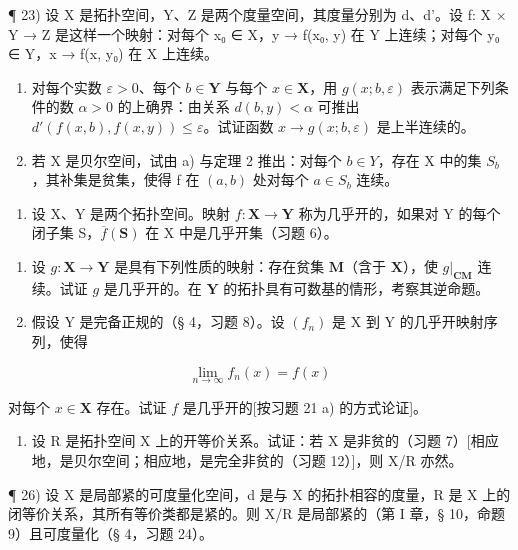 ¶ 23) 设 X 是拓扑空间，Y、Z 是两个度量空间，其度量分别为 d、d'。设 f: X × Y → Z 是这样一个映射：对每个 x₀ ∈ X，y → f(x₀, y) 在 Y 上连续；对每个 y₀ ∈ Y，x → f(x, y₀) 在 X 上连续。

\begin{enumerate}
\def\labelenumi{\alph{enumi})}
\item
  对每个实数 \(\varepsilon > 0\)、每个 \(b \in \mathbf{Y}\) 与每个 \(x \in \mathbf{X}\)，用 \(g(x; b, \varepsilon)\) 表示满足下列条件的数 \(\alpha > 0\) 的上确界：由关系 \(d(b, y) < \alpha\) 可推出 \(d'(f(x, b), f(x, y)) \leqslant \varepsilon\)。试证函数 \(x \to g(x; b, \varepsilon)\) 是上半连续的。
\item
  若 X 是贝尔空间，试由 a) 与定理 2 推出：对每个 \(b \in Y\)，存在 X 中的集 \(S_{b}\)，其补集是贫集，使得 f 在 \((a, b)\) 处对每个 \(a \in S_{b}\) 连续。
\end{enumerate}

\begin{enumerate}
\def\labelenumi{\arabic{enumi})}
\setcounter{enumi}{23}
\tightlist
\item
  设 X、Y 是两个拓扑空间。映射 \(f: \mathbf{X} \to \mathbf{Y}\) 称为几乎开的，如果对 Y 的每个闭子集 S，\(\overline{f}(\mathbf{S})\) 在 X 中是几乎开集（习题 6）。
\end{enumerate}

\begin{enumerate}
\def\labelenumi{\alph{enumi})}
\item
  设 \(g: \mathbf{X} \to \mathbf{Y}\) 是具有下列性质的映射：存在贫集 \(\mathbf{M}\)（含于 \(\mathbf{X}\)），使 \(g|_{\mathbf{CM}}\) 连续。试证 \(g\) 是几乎开的。在 \(\mathbf{Y}\) 的拓扑具有可数基的情形，考察其逆命题。
\item
  假设 Y 是完备正规的（§ 4，习题 8）。设 \((f_n)\) 是 X 到 Y 的几乎开映射序列，使得
\end{enumerate}

\[
\lim _ {n \rightarrow \infty} f _ {n} (x) = f (x)
\]

对每个 \(x \in \mathbf{X}\) 存在。试证 \(f\) 是几乎开的{[}按习题 21 a) 的方式论证{]}。

\begin{enumerate}
\def\labelenumi{\arabic{enumi})}
\setcounter{enumi}{24}
\tightlist
\item
  设 R 是拓扑空间 X 上的开等价关系。试证：若 X 是非贫的（习题 7）{[}相应地，是贝尔空间；相应地，是完全非贫的（习题 12）{]}，则 X/R 亦然。
\end{enumerate}

¶ 26) 设 X 是局部紧的可度量化空间，d 是与 X 的拓扑相容的度量，R 是 X 上的闭等价关系，其所有等价类都是紧的。则 X/R 是局部紧的（第 I 章，§ 10，命题 9）且可度量化（§ 4，习题 24）。

